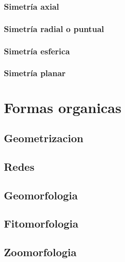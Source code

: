 \documentclass[
  16pt,
]{krantz}
\theoremstyle{definition}
\theoremstyle{definition}
\theoremstyle{definition}
\theoremstyle{definition}
\theoremstyle{remark}
\begin{document}
\hypertarget{simetruxeda-axial}{%
\subsection{Simetría axial}\label{simetruxeda-axial}}

\hypertarget{simetruxeda-radial-o-puntual}{%
\subsection{Simetría radial o puntual}\label{simetruxeda-radial-o-puntual}}

\hypertarget{simetruxeda-esferica}{%
\subsection{Simetría esferica}\label{simetruxeda-esferica}}

\hypertarget{simetruxeda-planar}{%
\subsection{Simetría planar}\label{simetruxeda-planar}}

\hypertarget{formas-organicas}{%
\chapter{Formas organicas}\label{formas-organicas}}

\hypertarget{geometrizacion}{%
\section{Geometrizacion}\label{geometrizacion}}

\hypertarget{redes}{%
\section{Redes}\label{redes}}

\hypertarget{geomorfologia}{%
\section{Geomorfologia}\label{geomorfologia}}

\hypertarget{fitomorfologia}{%
\section{Fitomorfologia}\label{fitomorfologia}}

\hypertarget{zoomorfologia}{%
\section{Zoomorfologia}\label{zoomorfologia}}
\end{document}

